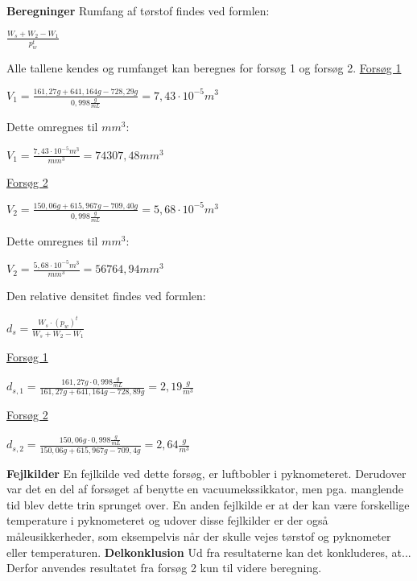 \textbf{Beregninger}
\newline
Rumfang af tørstof findes ved formlen:
\begin{center}
	$\frac{W_s + W_2 - W_1}{p_{w}^t}$
\end{center}

Alle tallene kendes og rumfanget kan beregnes for forsøg 1 og forsøg 2.
\newline
\newline
\underline{Forsøg 1}
\begin{center}
	$V_1=\frac{161,27 g +641,164 g - 728,29 g}{0,998 \frac{g}{mL}}=7,43\cdot 10^{-5} m^3$
\end{center}

Dette omregnes til $mm^3$:
\begin{center}
	$V_1=\frac{7,43\cdot 10^{-5} m^3}{mm^3}=74307,48 mm^3$
\end{center}

\underline{Forsøg 2}
\begin{center}
	$V_2=\frac{150,06 g + 615,967 g - 709,40 g}{0,998 \frac{g}{mL}}=5,68 \cdot 10^{-5} m^3$
\end{center}

Dette omregnes til $mm^3$:
\begin{center}
	$V_2=\frac{5,68 \cdot 10^{-5} m^3}{mm^3}=56764,94 mm^3$
\end{center}

Den relative densitet findes ved formlen:
\begin{center}
	$d_s=\frac{W_s\cdot (p_w)^t}{W_s + W_2 - W_1}$
\end{center}

\underline{Forsøg 1}
\begin{center}
	$d_{s,1}=\frac{161,27 g\cdot 0,998 \frac{g}{mL}}{161,27 g + 641,164 g - 728,89 g}=2,19 \frac{g}{m^3}$
\end{center}

\underline{Forsøg 2}
\begin{center}
	$d_{s,2}=\frac{150,06 g\cdot 0,998 \frac{g}{mL}}{150,06 g + 615,967 g - 709,4 g}=2,64 \frac{g}{m^3}$
\end{center}

\textbf{Fejlkilder}
\newline
En fejlkilde ved dette forsøg, er luftbobler i pyknometeret. Derudover var det en del af forsøget af benytte en vacuumekssikkator, men pga. manglende tid blev dette trin sprunget over. En anden fejlkilde er at der kan være forskellige temperature i pyknometeret og udover disse fejlkilder er der også måleusikkerheder, som eksempelvis når der skulle vejes tørstof og pyknometer eller temperaturen.
\newline
\newline
\textbf{Delkonklusion}
\newline
Ud fra resultaterne kan det konkluderes, at... Derfor anvendes resultatet fra forsøg 2 kun til videre beregning.